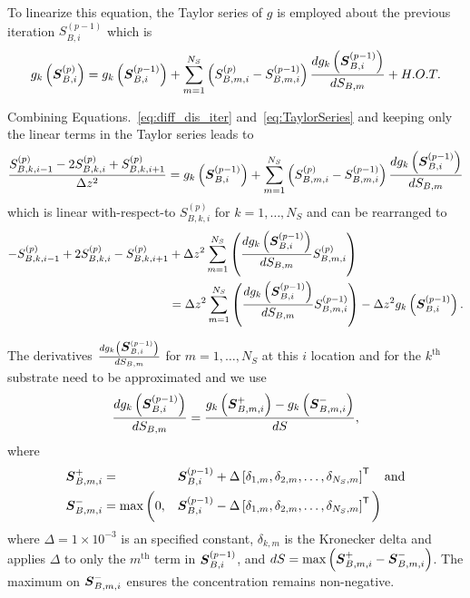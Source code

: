 \documentclass[letterpaper, twoside]{article}
\numberwithin{equation}{section}
\def\bm#1{\mbox{\boldmath{$#1$}}}
\begin{document}
To linearize this equation, the Taylor series of $g$ is employed about the previous iteration $S_{B,i}^{(p-1)}$ which is
\begin{equation}\label{eq:TaylorSeries}
  g_k\left(\bm{S}_{B,i}^{(p)}\right) =   g_k\left(\bm{S}_{B,i}^{(p-1)}\right) + \sum_{m=1}^{N_S} \left( S_{B,m,i}^{(p)} - S_{B,m,i}^{(p-1)}\right) \frac{d g_k\left(\bm{S}_{B,i}^{(p-1)}\right)}{d S_{B,m}} + H.O.T.
\end{equation}

Combining Equations.~\ref{eq:diff_dis_iter} and~\ref{eq:TaylorSeries} and keeping only the linear terms in the Taylor series leads to
\begin{equation} \label{eq:diff_linear}
  \frac{ S_{B,k,i-1}^{(p)} - 2 S_{B,k,i}^{(p)} + S_{B,k,i+1}^{(p)}}{\Delta z^2} = g_k\left(\bm{S}_{B,i}^{(p-1)}\right) + \sum_{m=1}^{N_S} \left( S_{B,m,i}^{(p)} - S_{B,m,i}^{(p-1)}\right)  \frac{d g_k\left(\bm{S}_{B,i}^{(p-1)}\right)}{d S_{B,m}} 
\end{equation}
which is linear with-respect-to $S_{B,k,i}^{(p)}$ for $k=1,\dots,N_S$ and can be rearranged to
\begin{equation}
  \label{eq:diff_final}
  \begin{split}
    -S_{B,k,i-1}^{(p)} + 2 S_{B,k,i}^{(p)} - S_{B,k,i+1}^{(p)}
    &+  \Delta z^2\sum_{m=1}^{N_S} \left( \frac{d g_k\left(\bm{S}_{B,i}^{(p-1)}\right)}{d S_{B,m}}  S_{B,m,i}^{(p  )}\right)\\
    &=  \Delta z^2\sum_{m=1}^{N_S} \left( \frac{d g_k\left(\bm{S}_{B,i}^{(p-1)}\right)}{d S_{B,m}}  S_{B,m,i}^{(p-1)}\right) - \Delta z^2 g_k\left(\bm{S}_{B,i}^{(p-1)}\right) .
  \end{split}
\end{equation}

The derivatives $\frac{d g_k\left(\bm{S}_{B,i}^{(p-1)}\right)}{d S_{B,m}}$  for $m=1,\dots,N_S$ at this $i$ location and for the $k^\mathrm{th}$ substrate need to be approximated and we use
\begin{equation}
  \label{eq:dgds}
  \frac{d g_k\left(\bm{S}_{B,i}^{(p-1)}\right)}{d S_{B,m}} = \frac{g_k\left(\bm{S}_{B,m,i}^+\right) - g_k\left(\bm{S}_{B,m,i}^{-}\right)}{ dS},
\end{equation}
where
\begin{alignat*}{3}
  \bm{S}_{B,m,i}^+&=          &&\bm{S}_{B,i}^{(p-1)}+ \Delta \left[\delta_{1,m},\delta_{2,m},\dots,\delta_{N_S,m}\right]^\mathsf{T} \text{\quad and} \\
  \bm{S}_{B,m,i}^-&=\max \bigg ( 0, &&\bm{S}_{B,i}^{(p-1)}- \Delta \left[\delta_{1,m},\delta_{2,m},\dots,\delta_{N_S,m}\right]^\mathsf{T} \bigg )
\end{alignat*}
where $\Delta=1\times 10^{-3}$ is an specified constant, $\delta_{k,m}$ is the Kronecker delta and applies $\Delta$ to only the $m^\mathrm{th}$ term in $\bm{S}_{B,i}^{(p-1)}$, and $dS = \max\left(\bm{S}_{B,m,i}^+ - \bm{S}_{B,m,i}^-\right)$.  The maximum on $\bm{S}_{B,m,i}^-$ ensures the concentration remains non-negative.
\end{document}
